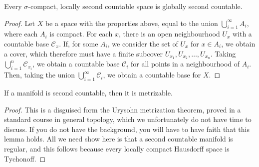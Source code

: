 \begin{lemma}[$1) \to (2$]
    Every $\sigma$-compact, locally second countable space is globally second countable.
\end{lemma}
\begin{proof}
    Let $X$ be a space with the properties above, equal to the union $\bigcup_{i = 1}^\infty A_i$, where each $A_i$ is compact. For each $x$, there is an open neighbourhood $U_x$ with a countable base $\mathcal{C}_x$. If, for some $A_i$, we consider the set of $U_x$ for $x \in A_i$, we obtain a cover, which therefore must have a finite subcover $U_{x_1}, U_{x_2}, \dots, U_{x_n}$. Taking $\bigcup_{i = 1}^n \mathcal{C}_{x_i}$, we obtain a countable base $\mathcal{C}_i$ for all points in a neighbourhood of $A_i$. Then, taking the union $\bigcup_{i = 1}^\infty \mathcal{C}_i$, we obtain a countable base for $X$.
\end{proof}

\begin{lemma}[$2) \to (3$]
    If a manifold is second countable, then it is metrizable.
\end{lemma}
\begin{proof}
    This is a disguised form the Urysohn metrization theorem, proved in a standard course in general topology, which we unfortunately do not have time to discuss. If you do not have the background, you will have to have faith that this lemma holds. All we need show here is that a second countable manifold is regular, and this follows because every locally compact Hausdorff space is Tychonoff.
\end{proof}

